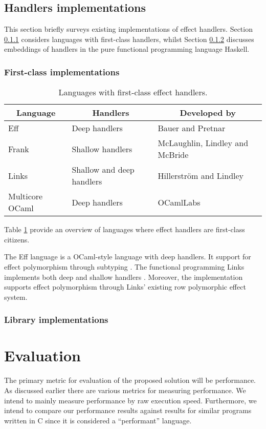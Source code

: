 \documentclass[preprint,10pt,numbers]{sigplanconf}
\begin{document}
  \subsection{Handlers implementations}
  This section briefly surveys existing implementations of effect handlers. Section \ref{sec:first-class} considers languages with first-class handlers, whilst Section \ref{sec:library} discusses embeddings of handlers in the pure functional programming language Haskell.
  \subsubsection{First-class implementations}\label{sec:first-class}
  \begin{table}[H]
    \centering 
    \begin{tabular}{| l | l | l |}
      \hline
      \multicolumn{1}{|c|}{Language} & \multicolumn{1}{c|}{Handlers} & \multicolumn{1}{c|}{Developed by} \\
      \hline
      Eff & Deep handlers & Bauer and Pretnar \\ 
      \hline
      Frank & Shallow handlers & McLaughlin, Lindley and McBride \\    
      \hline
      Links & Shallow and deep handlers & Hillerström and Lindley\\
      \hline
      Multicore OCaml & Deep handlers & OCamlLabs \\
      \hline    
    \end{tabular}\caption{Languages with first-class effect handlers.}\label{tbl:impls}
  \end{table}
  Table \ref{tbl:impls} provide an overview of languages where effect handlers are first-class citizens. 

The Eff language is a OCaml-style language with deep handlers. It support for effect polymorphism through subtyping \cite{Bauer2015}. 
The functional programming Links implements both deep and shallow handlers \cite{Hillerstrom2015}. Moreover, the implementation supports effect polymorphism through Links' existing row polymorphic effect system.
    
  \subsubsection{Library implementations}\label{sec:library}

  \section{Evaluation}
  The primary metric for evaluation of the proposed solution will be performance. As discussed earlier there are various metrics for measuring performance. We intend to mainly measure performance by raw execution speed. Furthermore, we intend to compare our performance results against results for similar programs written in C since it is considered a ``performant'' language. 
\end{document}
